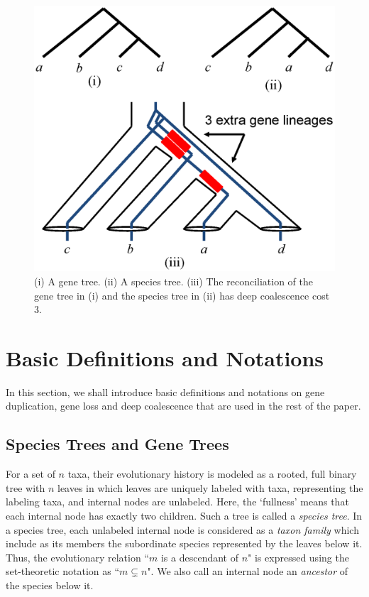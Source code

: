 \documentclass[9.5pt,journal,letterpaper,compsoc]{IEEEtran}
\begin{document}
\begin{figure}[bth!]
\begin{center}
\includegraphics[width=0.7\columnwidth]{Figure1.eps}
\end{center}
\caption{(i) A gene tree. (ii) A species tree. (iii)
  The reconciliation of  the gene tree in (i) and the species tree in (ii) has
deep coalescence cost 3.
\label{DCExample}
}
\end{figure}

\section{Basic Definitions and Notations}

In this section, we shall introduce basic definitions and notations on
gene duplication, gene loss and deep coalescence that are used in
 the rest of the paper.

\subsection{Species Trees and Gene Trees}

For a set of $n$ taxa, their evolutionary history is modeled as a rooted, full
binary tree with $n$ leaves in which leaves are uniquely labeled with taxa,
 representing the labeling taxa,
and internal nodes are unlabeled.   Here, the `fullness' means that
each internal node has exactly two children. Such a tree is called a
{\it species tree}. In a species tree, each unlabeled internal node
is considered as a {\it taxon family} which include as its members
the subordinate species represented by the leaves below it. Thus,
the evolutionary relation ``$m$ is a descendant of $n$" is expressed
using the set-theoretic notation as ``$m\subsetneq n$".
  We also call an internal node  an {\it ancestor} of the species below it.
\end{document}
